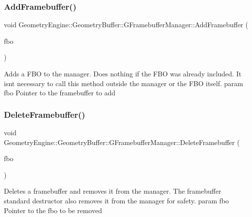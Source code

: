 \subsubsection{\texorpdfstring{AddFramebuffer()}{AddFramebuffer()}}
{\footnotesize\ttfamily void Geometry\+Engine\+::\+Geometry\+Buffer\+::\+G\+Framebuffer\+Manager\+::\+Add\+Framebuffer (\begin{DoxyParamCaption}\item[{\mbox{\hyperlink{class_geometry_engine_1_1_geometry_buffer_1_1_g_framebuffer_object}{G\+Framebuffer\+Object}} $\ast$}]{fbo }\end{DoxyParamCaption})}

Adds a F\+BO to the manager. Does nothing if the F\+BO was already included. It isn\textquotesingle{}t necessary to call this method outside the manager or the F\+BO itself. param fbo Pointer to the framebuffer to add \mbox{\label{class_geometry_engine_1_1_geometry_buffer_1_1_g_framebuffer_manager_a53ef67132cb5556dc5fd60d01c3a6b9e}} 
\subsubsection{\texorpdfstring{DeleteFramebuffer()}{DeleteFramebuffer()}}
{\footnotesize\ttfamily void Geometry\+Engine\+::\+Geometry\+Buffer\+::\+G\+Framebuffer\+Manager\+::\+Delete\+Framebuffer (\begin{DoxyParamCaption}\item[{\mbox{\hyperlink{class_geometry_engine_1_1_geometry_buffer_1_1_g_framebuffer_object}{G\+Framebuffer\+Object}} $\ast$}]{fbo }\end{DoxyParamCaption})}

Deletes a framebuffer and removes it from the manager. The framebuffer standard destructor also removes it from the manager for safety. param fbo Pointer to the fbo to be removed \mbox{\label{class_geometry_engine_1_1_geometry_buffer_1_1_g_framebuffer_manager_a4409dc69749e27c6864b25a76b1bcec9}} 
